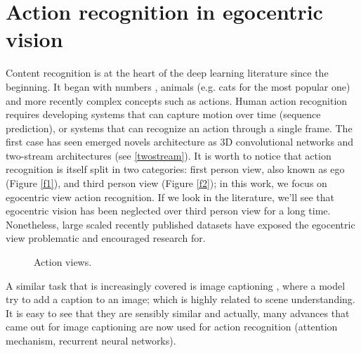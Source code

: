 \documentclass[12pt, a4paper]{report}
\begin{document}
	\chapter{Action recognition in egocentric vision}\label{ar}
		Content recognition is at the heart of the deep learning literature since the beginning. It began with numbers \cite{lecun_98}, animals (e.g. cats for the most popular one) and more recently complex concepts such as actions.
		Human action recognition requires developing systems that can capture motion over time (sequence prediction), or systems that can recognize an action through a single frame.
		The first case has seen emerged novels architecture as 3D convolutional networks \cite{ji} and two-stream architectures \cite{sudhakaran, wang, ye} (see \ref{twostream}).
		It is worth to notice that action recognition is itself split in two categories: first person view, also known as \gls{ego} (Figure \ref{f1}), and third person view (Figure \ref{f2}); in this work, we focus on egocentric view action recognition.
		If we look in the literature, we'll see that egocentric vision has been neglected over third person view for a long time.
		Nonetheless, large scaled recently published datasets have exposed the egocentric view problematic and encouraged research for.
		\begin{figure}[!tbp]
			\centering
			\hfill
			\caption{Action views.}
		\end{figure}
		A similar task that is increasingly covered is image captioning \cite{xu}, where a model try to add a caption to an image; which is highly related to scene understanding.
		It is easy to see that they are sensibly similar and actually, many advances that came out for image captioning are now used for action recognition (attention mechanism, recurrent neural networks).
\end{document}
